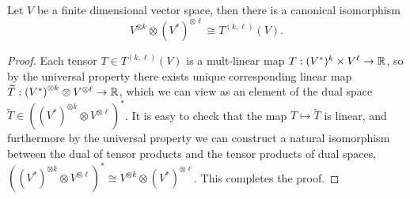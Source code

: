 \begin{theorem}
	Let $V$ be a finite dimensional vector space, then there is a canonical isomorphism
		\[ {V}^{\otimes k} \otimes {(V^*)}^{\otimes \ell} \cong T^{(k, \ell)} (V).  \]
\end{theorem}

\begin{proof}
	Each tensor $T \in T^{(k, \ell)} (V)$ is a mult-linear map $T: (V^*)^k \times V^\ell  \to \mathbb R$, so by the universal property there exists unique corresponding linear map $\widetilde T : {(V^*)}^{\otimes k} \otimes {V}^{\otimes \ell} \to \mathbb R$, which we can view as an element of the dual space $\widetilde T \in ({(V^*)}^{\otimes k} \otimes {V}^{\otimes \ell})^*$. It is easy to check that the map $T \mapsto \widetilde T$ is linear, and furthermore by the universal property we can construct a natural isomorphism between the dual of tensor products and the tensor products of dual spaces, $({(V^*)}^{\otimes k} \otimes {V}^{\otimes \ell})^* \cong {V}^{\otimes k} \otimes {(V^*)}^{\otimes \ell}$. This completes the proof. 
\end{proof}


